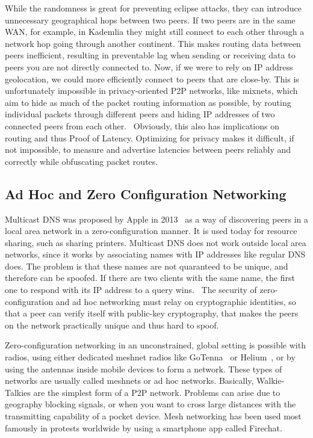 While the randomness is great for preventing eclipse attacks, they can introduce unnecessary geographical hops between two peers. If two peers are in the same WAN, for example, in Kademlia they might still connect to each other through a network hop going through another continent. This makes routing data between peers inefficient, resulting in preventable lag when sending or receiving data to peers you are not directly connected to.
Now, if we were to rely on IP address geolocation, we could more efficiently connect to peers that are close-by. This is unfortunately impossible in privacy-oriented P2P networks, like mixnets, which aim to hide as much of the packet routing information as possible, by routing individual packets through different peers and hiding IP addresses of two connected peers from each other.~\cite{Harry_Halpin_undated-sq} Obviously, this also has implications on routing and thus Proof of Latency. Optimizing for privacy makes it difficult, if not impossible, to measure and advertise latencies between peers reliably and correctly while obfuscating packet routes.

\subsection{Ad Hoc and Zero Configuration Networking}
Multicast DNS was proposed by Apple in 2013~\cite{Cheshire2013-ja} as a way of discovering peers in a local area network in a zero-configuration manner. It is used today for resource sharing, such as sharing printers. Multicast DNS does not work outside local area networks, since it works by associating names with IP addresses like regular DNS does. The problem is that these names are not quaranteed to be unique, and therefore can be spoofed. If there are two clients with the same name, the first one to respond with its IP address to a query wins.~\cite{Pdp2008-tg} The security of zero-configuration and ad hoc networking must relay on cryptographic identities, so that a peer can verify itself with public-key cryptography, that makes the peers on the network practically unique and thus hard to spoof.

Zero-configuration networking in an unconstrained, global setting is possible with radios, using either dedicated meshnet radios like GoTenna~\cite{GoTenna_undated-km} or Helium~\cite{Helium_undated-jv}, or by using the antennas inside mobile devices to form a network. These types of networks are usually called meshnets or ad hoc networks. Basically, Walkie-Talkies are the simplest form of a P2P network. Problems can arise due to geography blocking signals, or when you want to cross large distances with the transmitting capability of a pocket device. Mesh networking has been used most famously in protests worldwide by using a smartphone app called Firechat.~\cite{Milian2014-mt}

